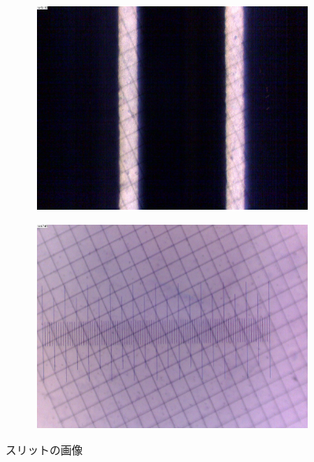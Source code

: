 \begin{figure}[htbp]
    \centering
    \addtocounter{figure}{-1}
    \begin{subfigure}{0.48\hsize}\centering
        \addtocounter{subfigure}{6}
        \includegraphics[width=\linewidth]{src/figures/result/ds3_slit.jpg}
        \label{subfig:ds3_slit}
    \end{subfigure}
    \begin{subfigure}{0.48\hsize}\centering
        \includegraphics[width=\linewidth]{src/figures/result/meaure_slit.jpg}
        \label{subfig:measure}
    \end{subfigure}
    \caption{スリットの画像}\label{fig:slit_image}
\end{figure}
